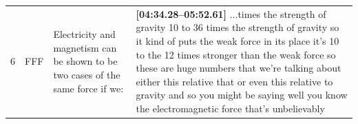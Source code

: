 \documentclass[10pt]{article}
\begin{document}
\begin{tiny}
\begin{longtable}{|r|p{0.375in}|p{1.275in}|p{3.5in}|}
6  &          FFF &                                                                                                                                                                                                  Electricity and magnetism can be shown to be two cases of the same force if we: &                                                                                                                                                                                                                                                                                                                                                                                                                                                                                                                                                                                                                                                                                                                                                                                                                                                                                                                                                                                                                                                                                                                                                                                                                                                                                                                                                                                                                                                                                                                                                                                                                                                                                                                                                                                                                                                                                                                                                                                                                                                                                                                                                                                                                                                                                                                                                                                                                                                                                                                                                                                                                                                                          \textbf{[04:34.28--05:52.61]} ...times the strength of gravity 10 to 36 times the strength of gravity so it kind of puts the weak force in its place it's 10 to the 12 times stronger than the weak force so these are huge numbers that we're talking about either this relative that or even this relative to gravity and so you might be saying well you know the electromagnetic force that's unbelievably 
\end{longtable}
\end{tiny}
\end{document}
